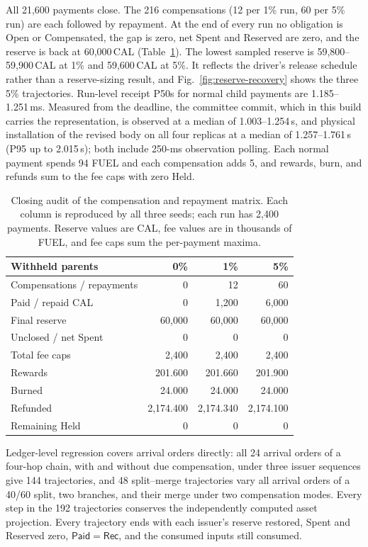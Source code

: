 All 21,600 payments close. The 216 compensations (12 per 1\% run, 60 per 5\%
run) are each followed by repayment. At the end of every run no obligation is
Open or Compensated, the gap is zero, net Spent and Reserved are zero, and the
reserve is back at 60,000\,CAL (Table~\ref{archive:tab:eval-audit}). The lowest
sampled reserve is 59,800--59,900\,CAL at 1\% and 59,600\,CAL at 5\%. It
reflects the driver's release schedule rather than a reserve-sizing result,
and Fig.~\ref{fig:reserve-recovery} shows the three 5\% trajectories. Run-level receipt P50s
for normal child payments are 1.185--1.251\,ms. Measured from the deadline, the
committee commit, which in this build carries the representation, is observed
at a median of 1.003--1.254\,s, and physical installation of the revised
body on all four replicas at a median of 1.257--1.761\,s (P95 up to 2.015\,s); both include 250-ms observation
polling. Each normal payment spends 94 FUEL and each compensation adds 5, and
rewards, burn, and refunds sum to the fee caps with zero Held.

\begin{table}[t]
  \caption{Closing audit of the compensation and repayment matrix. Each
    column is reproduced by all three seeds; each run has 2,400 payments.
    Reserve values are CAL, fee values are in thousands of FUEL, and fee
    caps sum the per-payment maxima.}
  \label{archive:tab:eval-audit}
  \centering
  \small
  \begin{tabular}{@{}lrrr@{}}
    \toprule
    Withheld parents & 0\% & 1\% & 5\% \\
    \midrule
    Compensations / repayments & 0 & 12 & 60 \\
    Paid / repaid CAL & 0 & 1,200 & 6,000 \\
    Final reserve & 60,000 & 60,000 & 60,000 \\
    Unclosed / net Spent & 0 & 0 & 0 \\
    Total fee caps & 2,400 & 2,400 & 2,400 \\
    Rewards & 201.600 & 201.660 & 201.900 \\
    Burned & 24.000 & 24.000 & 24.000 \\
    Refunded & 2,174.400 & 2,174.340 & 2,174.100 \\
    Remaining Held & 0 & 0 & 0 \\
    \bottomrule
  \end{tabular}
\end{table}

Ledger-level regression covers arrival orders directly: all 24 arrival orders
of a four-hop chain, with and without due compensation, under three issuer
sequences give 144 trajectories, and 48 split--merge trajectories vary all
arrival orders of a 40/60 split, two branches, and their merge under two
compensation modes. Every step in the 192 trajectories conserves the
independently computed asset projection. Every trajectory ends with each
issuer's reserve restored, Spent and Reserved zero, $\mathsf{Paid}=\mathsf{Rec}$,
and the consumed inputs still consumed.

